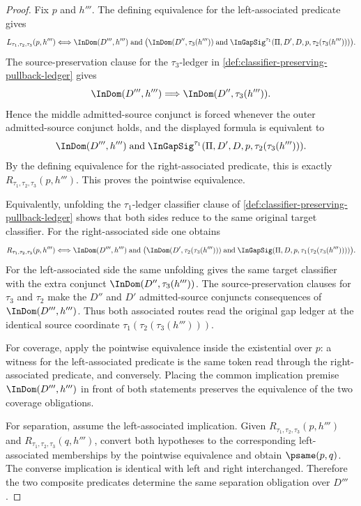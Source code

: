 \begin{proof}
Fix $p$ and $h'''$. The defining equivalence for the left-associated predicate gives
$$
  L_{\tau_1,\tau_2,\tau_3}(p,h''')
  \Longleftrightarrow
  \InDom(D''',h''')\;\text{and}\;
  \bigl(\InDom(D'',\tau_3(h'''))\;\text{and}\;
  {\InGapSig}^{\tau_1}(\Pi,D',D,p,\tau_2(\tau_3(h''')))\bigr).
$$
The source-preservation clause for the $\tau_3$-ledger in \autoref{def:classifier-preserving-pullback-ledger} gives
$$
  \InDom(D''',h''')\Longrightarrow\InDom(D'',\tau_3(h''')).
$$
Hence the middle admitted-source conjunct is forced whenever the outer admitted-source conjunct holds, and the displayed formula is equivalent to
$$
  \InDom(D''',h''')\;\text{and}\;
  {\InGapSig}^{\tau_1}(\Pi,D',D,p,\tau_2(\tau_3(h'''))).
$$
By the defining equivalence for the right-associated predicate, this is exactly $R_{\tau_1,\tau_2,\tau_3}(p,h''')$. This proves the pointwise equivalence.

Equivalently, unfolding the $\tau_1$-ledger classifier clause of \autoref{def:classifier-preserving-pullback-ledger} shows that both sides reduce to the same original target classifier. For the right-associated side one obtains
$$
  R_{\tau_1,\tau_2,\tau_3}(p,h''')
  \Longleftrightarrow
  \InDom(D''',h''')\;\text{and}\;
  \bigl(\InDom(D',\tau_2(\tau_3(h''')))\;\text{and}\;
  \InGapSig(\Pi,D,p,\tau_1(\tau_2(\tau_3(h'''))))\bigr).
$$
For the left-associated side the same unfolding gives the same target classifier with the extra conjunct $\InDom(D'',\tau_3(h'''))$. The source-preservation clauses for $\tau_3$ and $\tau_2$ make the $D''$ and $D'$ admitted-source conjuncts consequences of $\InDom(D''',h''')$. Thus both associated routes read the original gap ledger at the identical source coordinate $\tau_1(\tau_2(\tau_3(h''')))$.

For coverage, apply the pointwise equivalence inside the existential over $p$: a witness for the left-associated predicate is the same token read through the right-associated predicate, and conversely. Placing the common implication premise $\InDom(D''',h''')$ in front of both statements preserves the equivalence of the two coverage obligations.

For separation, assume the left-associated implication. Given $R_{\tau_1,\tau_2,\tau_3}(p,h''')$ and $R_{\tau_1,\tau_2,\tau_3}(q,h''')$, convert both hypotheses to the corresponding left-associated memberships by the pointwise equivalence and obtain $\psame(p,q)$. The converse implication is identical with left and right interchanged. Therefore the two composite predicates determine the same separation obligation over $D'''$.
\end{proof}

